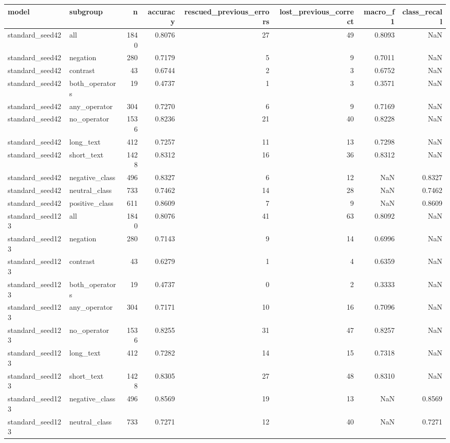 \begin{tabular}{llrrrrrr}
\toprule
model & subgroup & n & accuracy & rescued\_previous\_errors & lost\_previous\_correct & macro\_f1 & class\_recall \\
\midrule
standard\_seed42 & all & 1840 & 0.8076 & 27 & 49 & 0.8093 & NaN \\
standard\_seed42 & negation & 280 & 0.7179 & 5 & 9 & 0.7011 & NaN \\
standard\_seed42 & contrast & 43 & 0.6744 & 2 & 3 & 0.6752 & NaN \\
standard\_seed42 & both\_operators & 19 & 0.4737 & 1 & 3 & 0.3571 & NaN \\
standard\_seed42 & any\_operator & 304 & 0.7270 & 6 & 9 & 0.7169 & NaN \\
standard\_seed42 & no\_operator & 1536 & 0.8236 & 21 & 40 & 0.8228 & NaN \\
standard\_seed42 & long\_text & 412 & 0.7257 & 11 & 13 & 0.7298 & NaN \\
standard\_seed42 & short\_text & 1428 & 0.8312 & 16 & 36 & 0.8312 & NaN \\
standard\_seed42 & negative\_class & 496 & 0.8327 & 6 & 12 & NaN & 0.8327 \\
standard\_seed42 & neutral\_class & 733 & 0.7462 & 14 & 28 & NaN & 0.7462 \\
standard\_seed42 & positive\_class & 611 & 0.8609 & 7 & 9 & NaN & 0.8609 \\
standard\_seed123 & all & 1840 & 0.8076 & 41 & 63 & 0.8092 & NaN \\
standard\_seed123 & negation & 280 & 0.7143 & 9 & 14 & 0.6996 & NaN \\
standard\_seed123 & contrast & 43 & 0.6279 & 1 & 4 & 0.6359 & NaN \\
standard\_seed123 & both\_operators & 19 & 0.4737 & 0 & 2 & 0.3333 & NaN \\
standard\_seed123 & any\_operator & 304 & 0.7171 & 10 & 16 & 0.7096 & NaN \\
standard\_seed123 & no\_operator & 1536 & 0.8255 & 31 & 47 & 0.8257 & NaN \\
standard\_seed123 & long\_text & 412 & 0.7282 & 14 & 15 & 0.7318 & NaN \\
standard\_seed123 & short\_text & 1428 & 0.8305 & 27 & 48 & 0.8310 & NaN \\
standard\_seed123 & negative\_class & 496 & 0.8569 & 19 & 13 & NaN & 0.8569 \\
standard\_seed123 & neutral\_class & 733 & 0.7271 & 12 & 40 & NaN & 0.7271 \\

\end{tabular}
